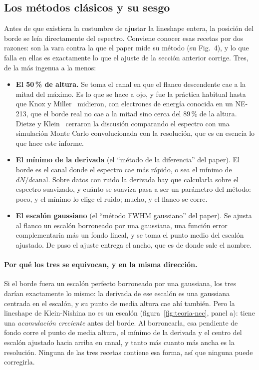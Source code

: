 \documentclass[11pt,a4paper]{article}
\begin{document}
\subsection{Los métodos clásicos y su sesgo}
\label{sec:clasicos}

Antes de que existiera la costumbre de ajustar la lineshape entera, la posición
del borde se leía directamente del espectro. Conviene conocer esas recetas por
dos razones: son la vara contra la que el paper mide su método (su Fig.~4), y
lo que falla en ellas es exactamente lo que el ajuste de la sección
anterior corrige. Tres, de la más ingenua a la menos:

\begin{itemize}
\item \textbf{El 50\,\% de altura.} Se toma el canal en que el flanco
      descendente cae a la mitad del máximo. Es lo que se hace a ojo, y fue
      la práctica habitual hasta que Knox y Miller~\cite{knox1972} midieron,
      con electrones de energía conocida en un NE-213, que el borde real no
      cae a la mitad sino cerca del 89\,\% de la altura. Dietze y
      Klein~\cite{dietze1982} cerraron la discusión comparando el espectro con
      una simulación Monte Carlo convolucionada con la resolución, que es en
      esencia lo que hace este informe.
\item \textbf{El mínimo de la derivada} (el ``método de la diferencia'' del
      paper). El borde es el canal donde el espectro cae más rápido, o sea el
      mínimo de $dN/d\text{canal}$. Sobre datos con ruido la derivada hay que
      calcularla sobre el espectro suavizado, y cuánto se suaviza pasa a ser
      un parámetro del método: poco, y el mínimo lo elige el ruido; mucho, y el
      flanco se corre.
\item \textbf{El escalón gaussiano} (el ``método FWHM gaussiano'' del paper).
      Se ajusta al flanco un escalón borroneado por una gaussiana, una función
      error complementaria más un fondo lineal, y se toma el punto medio del
      escalón ajustado. De paso el ajuste entrega el ancho, que es de donde
      sale el nombre.
\end{itemize}

\paragraph{Por qué los tres se equivocan, y en la misma dirección.} Si el
borde fuera un escalón perfecto borroneado por una gaussiana, los tres darían
exactamente lo mismo: la derivada de ese escalón es una gaussiana centrada en
el escalón, y su punto de media altura cae ahí también. Pero la lineshape de
Klein-Nishina no es un escalón (figura~\ref{fig:teoria-ncc}, panel a): tiene
una \emph{acumulación creciente} antes del borde. Al borronearla, esa pendiente
de fondo corre el punto de media altura, el mínimo de la derivada y el centro
del escalón ajustado hacia arriba en canal, y tanto más cuanto más ancha es la
resolución. Ninguna de las tres recetas contiene esa forma, así que ninguna
puede corregirla.
\end{document}
